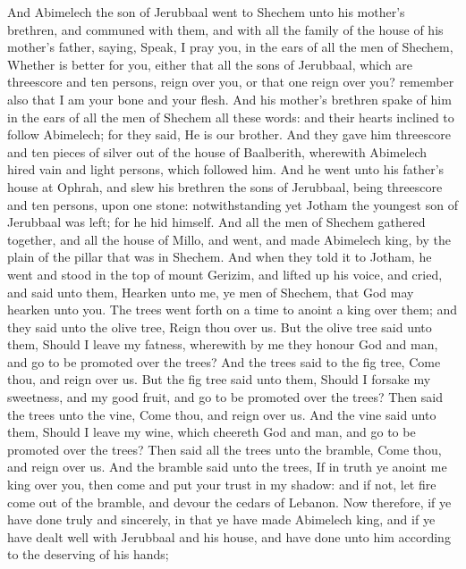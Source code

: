 \begin{biblechapter} %
 And Abimelech the son of Jerubbaal went to Shechem unto his mother's brethren, and communed with them, and with all the family of the house of his mother's father, saying,
\verse Speak, I pray you, in the ears of all the men of Shechem, Whether is better for you, either that all the sons of Jerubbaal, which are threescore and ten persons, reign over you, or that one reign over you? remember also that I am your bone and your flesh.
\verse And his mother's brethren spake of him in the ears of all the men of Shechem all these words: and their hearts inclined to follow Abimelech; for they said, He is our brother.
\verse And they gave him threescore and ten pieces of silver out of the house of Baalberith, wherewith Abimelech hired vain and light persons, which followed him.
\verse And he went unto his father's house at Ophrah, and slew his brethren the sons of Jerubbaal, being threescore and ten persons, upon one stone: notwithstanding yet Jotham the youngest son of Jerubbaal was left; for he hid himself.
\verse And all the men of Shechem gathered together, and all the house of Millo, and went, and made Abimelech king, by the plain of the pillar that was in Shechem.
\verse And when they told it to Jotham, he went and stood in the top of mount Gerizim, and lifted up his voice, and cried, and said unto them, Hearken unto me, ye men of Shechem, that God may hearken unto you.
\verse The trees went forth on a time to anoint a king over them; and they said unto the olive tree, Reign thou over us.
\verse But the olive tree said unto them, Should I leave my fatness, wherewith by me they honour God and man, and go to be promoted over the trees?
\verse And the trees said to the fig tree, Come thou, and reign over us.
\verse But the fig tree said unto them, Should I forsake my sweetness, and my good fruit, and go to be promoted over the trees?
\verse Then said the trees unto the vine, Come thou, and reign over us.
\verse And the vine said unto them, Should I leave my wine, which cheereth God and man, and go to be promoted over the trees?
\verse Then said all the trees unto the bramble, Come thou, and reign over us.
\verse And the bramble said unto the trees, If in truth ye anoint me king over you, then come and put your trust in my shadow: and if not, let fire come out of the bramble, and devour the cedars of Lebanon.
\verse Now therefore, if ye have done truly and sincerely, in that ye have made Abimelech king, and if ye have dealt well with Jerubbaal and his house, and have done unto him according to the deserving of his hands;

\end{biblechapter}
